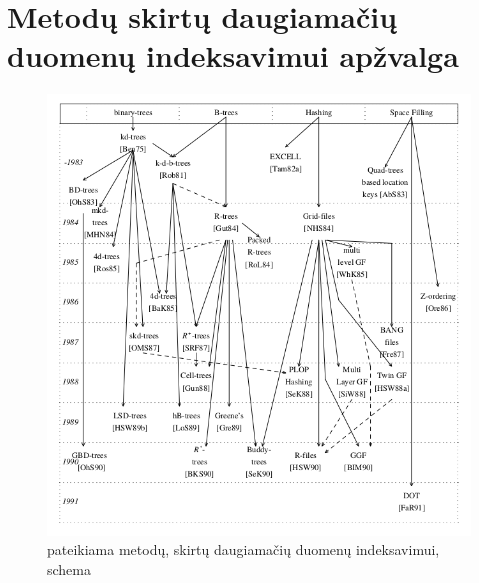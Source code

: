 \appendix

\section{Metodų skirtų daugiamačių duomenų indeksavimui apžvalga}
\label{app:multidimensionalIndexing}
\begin{figure}[H]
\begin{center}
\includegraphics[width=\textwidth]{img/MultidimensionalDataIndexing.png}
\caption{\cite{bader2012space} pateikiama metodų, skirtų daugiamačių duomenų indeksavimui, schema}
\end{center}
\end{figure}



